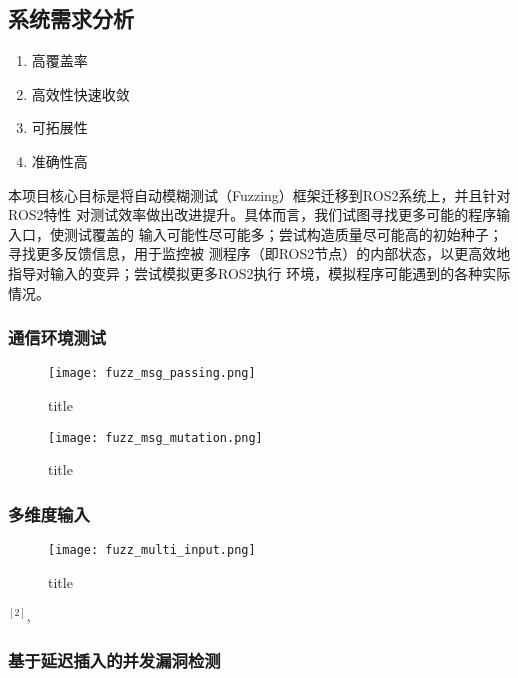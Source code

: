 \subsection{系统需求分析}
\setParDis %
\begin{enumerate}
  \item 高覆盖率
  \item 高效性快速收敛
  \item 可拓展性
  \item 准确性高
\end{enumerate}
本项目核心目标是将自动模糊测试（Fuzzing）框架迁移到ROS2系统上，并且针对ROS2特性
对测试效率做出改进提升。具体而言，我们试图寻找更多可能的程序输入口，使测试覆盖的
输入可能性尽可能多；尝试构造质量尽可能高的初始种子；寻找更多反馈信息，用于监控被
测程序（即ROS2节点）的内部状态，以更高效地指导对输入的变异；尝试模拟更多ROS2执行
环境，模拟程序可能遇到的各种实际情况。

\subsubsection{通信环境测试}

\begin{figure}[h]
    \centering
    \texttt{[image: fuzz\_msg\_passing.png]}
    \caption{ title}
    \label{pic:fmp}
\end{figure}

\begin{figure}[h]
    \centering
    \texttt{[image: fuzz\_msg\_mutation.png]}
    \caption{ title}
    \label{pic:fmm}
\end{figure}

\subsubsection{多维度输入}

\begin{figure}[h]
    \centering
    \texttt{[image: fuzz\_multi\_input.png]}
    \caption{ title}
    \label{pic:fmi}
\end{figure}

$^{[2]}$, 

\subsubsection{基于延迟插入的并发漏洞检测}

